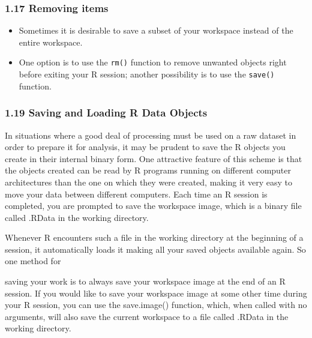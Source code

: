 \documentclass{beamer}
\begin{document}
 	\begin{frame}
 		\frametitle{1.17 Removing items}
 		\begin{itemize}
 			\item Sometimes it is desirable to save a subset of your workspace instead of the entire workspace.
 			\item One option is to use the \texttt{rm()} function to remove unwanted objects right before exiting your R
 			session; another possibility is to use the \texttt{save()} function.
 		\end{itemize}
 	\end{frame}
 	
 	
 
 	\begin{frame}
 		\frametitle{1.19 Saving and Loading R Data Objects}
 		In situations where a good deal of processing must be used on a raw dataset in order to prepare
 		it for analysis, it may be prudent to save the R objects you create in their internal binary form.
 		One attractive feature of this scheme is that the objects created can be read by R programs
 		running on different computer architectures than the one on which they were created, making it
 		very easy to move your data between different computers. Each time an R session is completed,
 		you are prompted to save the workspace image, which is a binary file called .RData in the
 		working directory.
 	\end{frame}
 	\begin{frame}
 		Whenever R encounters such a file in the working directory at the beginning of a session,
 		it automatically loads it making all your saved objects available again. So one method for
 		
 		saving your work is to always save your workspace image at the end of an R session. If you
 		would like to save your workspace image at some other time during your R session, you can use
 		the save.image() function, which, when called with no arguments, will also save the current
 		workspace to a file called .RData in the working directory.
 		
 	\end{frame}
\end{document}
